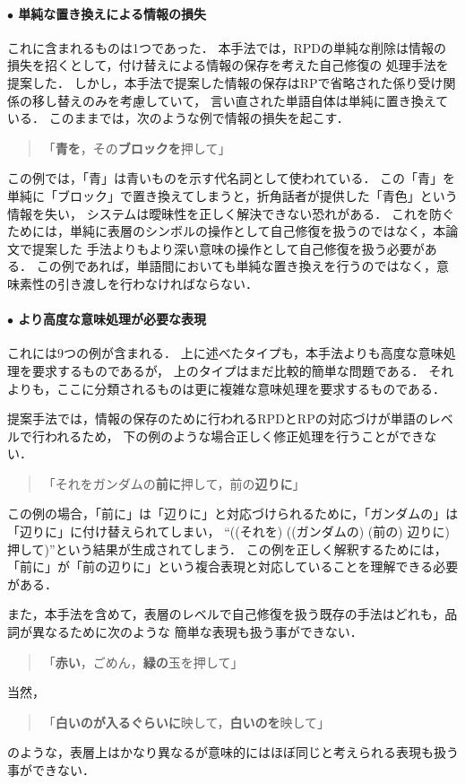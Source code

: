 \paragraph*{$\bullet$ 単純な置き換えによる情報の損失}
これに含まれるものは1つであった．
本手法では，RPDの単純な削除は情報の損失を招くとして，付け替えによる情報の保存を考えた自己修復の
処理手法を提案した．
しかし，本手法で提案した情報の保存はRPで省略された係り受け関係の移し替えのみを考慮していて，
言い直された単語自体は単純に置き換えている．
このままでは，次のような例で情報の損失を起こす．
\begin{quote}
「{\bf 青を}，その{\bf ブロックを}押して」
\end{quote}
この例では，「青」は青いものを示す代名詞として使われている．
この「青」を単純に「ブロック」で置き換えてしまうと，折角話者が提供した「青色」という情報を失い，
システムは曖昧性を正しく解決できない恐れがある．
これを防ぐためには，単純に表層のシンボルの操作として自己修復を扱うのではなく，本論文で提案した
手法よりもより深い意味の操作として自己修復を扱う必要がある．
この例であれば，単語間においても単純な置き換えを行うのではなく，意味素性の引き渡しを行わなければならない．

\paragraph*{$\bullet$ より高度な意味処理が必要な表現}
これには9つの例が含まれる．
上に述べたタイプも，本手法よりも高度な意味処理を要求するものであるが，
上のタイプはまだ比較的簡単な問題である．
それよりも，ここに分類されるものは更に複雑な意味処理を要求するものである．

提案手法では，情報の保存のために行われるRPDとRPの対応づけが単語のレベルで行われるため，
下の例のような場合正しく修正処理を行うことができない．
\begin{quote}
「それをガンダムの{\bf 前に}押して，前の{\bf 辺りに}」
\end{quote}
この例の場合，「前に」は「辺りに」と対応づけられるために，「ガンダムの」は「辺りに」に付け替えられてしまい，
``((それを) ((ガンダムの) (前の) 辺りに) 押して)''という結果が生成されてしまう．
この例を正しく解釈するためには，「前に」が「前の辺りに」という複合表現と対応していることを理解できる必要がある．

また，本手法を含めて，表層のレベルで自己修復を扱う既存の手法はどれも，品詞が異なるために次のような
簡単な表現も扱う事ができない．
\begin{quote}
「{\bf 赤い}，ごめん，{\bf 緑の}玉を押して」
\end{quote}
当然，
\begin{quote}
「{\bf 白いのが入るぐらいに}映して，{\bf 白いのを}映して」
\end{quote}
のような，表層上はかなり異なるが意味的にはほぼ同じと考えられる表現も扱う事ができない．

